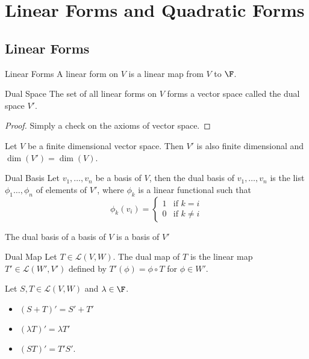 \section{Linear Forms and Quadratic Forms}
\subsection{Linear Forms}
\begin{defn}{Linear Forms}{} A linear form on $V$ is a linear map from $V$ to $\F$. 
\end{defn}

\begin{prp}{Dual Space}{} The set of all linear forms on $V$ forms a vector space called the dual space $V'$. \tcbline
\begin{proof}
Simply a check on the axioms of vector space. 
\end{proof}
\end{prp}

\begin{lmm}{}{} Let $V$ be a finite dimensional vector space. Then $V'$ is also finite dimensional and $\dim(V')=\dim(V)$. 
\end{lmm}

\begin{defn}{Dual Basis}{} Let $v_1,\dots,v_n$ be a basis of $V$, then the dual basis of $v_1,\dots,v_n$ is the list $\phi_1\dots,\phi_n$ of elements of $V'$, where $\phi_k$ is a linear functional such that $$\phi_k(v_i)=
\begin{cases}
1 & \text{if }k=i\\
0 & \text{if }k\neq i
\end{cases}$$
\end{defn}

\begin{prp}{}{} The dual basis of a basis of $V$ is a basis of $V'$
\end{prp}

\begin{defn}{Dual Map}{} Let $T\in\mathcal{L}(V,W)$. The dual map of $T$ is the linear map $T'\in\mathcal{L}(W',V')$ defined by $T'(\phi)=\phi\circ T$ for $\phi\in W'$. 
\end{defn}

\begin{prp}{}{} Let $S,T\in\mathcal{L}(V,W)$ and $\lambda\in\F$. 
\begin{itemize}
\item $(S+T)'=S'+T'$
\item $(\lambda T)'=\lambda T'$
\item $(ST)'=T'S'$. 
\end{itemize}
\end{prp}

